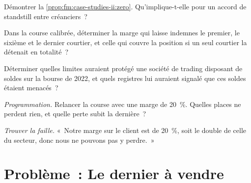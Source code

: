 \begin{exercise}[$\star\star$]\label{exo:fm:case-studies-ii:4}
Démontrer la \cref{prop:fm:case-studies-ii:zero}. Qu'implique-t-elle pour un accord de standstill entre créanciers~?
\end{exercise}

\begin{exercise}[$\star\star$]\label{exo:fm:case-studies-ii:5}
Dans la course calibrée, déterminer la marge qui laisse indemnes le premier, le sixième et le dernier courtier, et celle qui couvre la position
si un seul courtier la détenait en totalité~?
\end{exercise}

\begin{exercise}[$\star\star$]\label{exo:fm:case-studies-ii:6}
Déterminer quelles limites auraient protégé une société de trading disposant de soldes sur la bourse de 2022, et quels registres lui auraient signalé que ces soldes étaient menacés~?
\end{exercise}

\begin{exercise}[$\star\star\star$]\label{exo:fm:case-studies-ii:7}
\emph{Programmation.} Relancer la course avec une marge de 20~\%. Quelles places ne perdent rien, et quelle perte subit la dernière~?
\end{exercise}

\begin{exercise}[$\star\star\star$]\label{exo:fm:case-studies-ii:8}
\emph{Trouver la faille.} «~Notre marge sur le client est de 20~\%, soit le double de celle du secteur, donc nous ne pouvons pas y perdre.~»
\end{exercise}

\section{Problème~: Le dernier à vendre}

